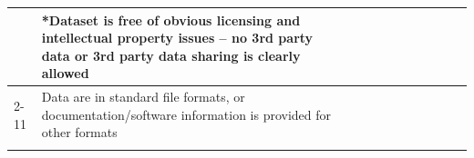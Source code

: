 \begin{table}[]
\begin{tabular}{|l|l|l|lllll|l|l|l|}
                                                               & *Dataset is free of obvious licensing and intellectual property issues – no 3rd party data or 3rd party data sharing is clearly allowed &                                                                                                                                              & \multicolumn{1}{l|}{}                                       & \multicolumn{1}{l|}{}                                                                           & \multicolumn{1}{l|}{}                                                                            & \multicolumn{1}{l|}{}                                                            &                                                             &                                                                                            &                                        &                     \\ \cline{2-11} 
                                                               & Data are in standard file formats, or documentation/software information is provided for other formats                                  &                                                                                                                                              & \multicolumn{1}{l|}{}                                       & \multicolumn{1}{l|}{}                                                                           & \multicolumn{1}{l|}{}                                                                            & \multicolumn{1}{l|}{}                                                            &                                                             &                                                                                            &                                        &                     \\ \hline
                                                               &                                                                                                                                         &                                                                                                                                              & \multicolumn{1}{l|}{}                                       & \multicolumn{1}{l|}{}                                                                           & \multicolumn{1}{l|}{}                                                                            & \multicolumn{1}{l|}{}                                                            &                                                             &                                                                                            &                                        &                     \\ \hline

\end{tabular}
\end{table}
